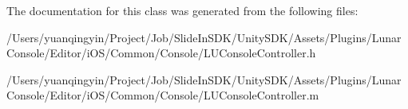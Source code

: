 The documentation for this class was generated from the following files\+:\begin{DoxyCompactItemize}
\item 
/\+Users/yuanqingyin/\+Project/\+Job/\+Slide\+In\+S\+D\+K/\+Unity\+S\+D\+K/\+Assets/\+Plugins/\+Lunar\+Console/\+Editor/i\+O\+S/\+Common/\+Console/L\+U\+Console\+Controller.\+h\item 
/\+Users/yuanqingyin/\+Project/\+Job/\+Slide\+In\+S\+D\+K/\+Unity\+S\+D\+K/\+Assets/\+Plugins/\+Lunar\+Console/\+Editor/i\+O\+S/\+Common/\+Console/L\+U\+Console\+Controller.\+m\end{DoxyCompactItemize}
